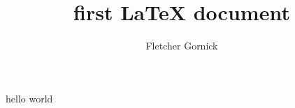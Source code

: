 \documentclass{article}
\begin{document}
\title{first \LaTeX{} document}
\author{Fletcher Gornick}

\maketitle

hello world
\end{document}
